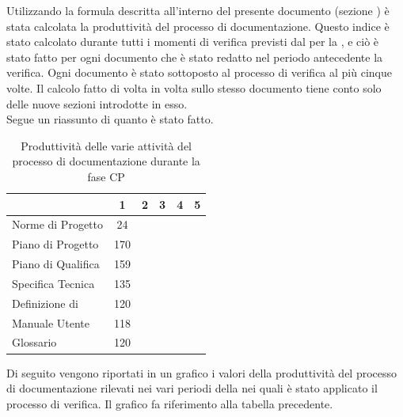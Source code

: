Utilizzando la formula descritta all'interno del presente documento (sezione ) è stata calcolata la produttività del processo di documentazione. Questo indice è stato calcolato durante tutti i momenti di verifica previsti dal  per la , e ciò è stato fatto per ogni documento che è stato redatto nel periodo antecedente la verifica. Ogni documento è stato sottoposto al processo di verifica al più cinque volte. Il calcolo fatto di volta in volta sullo stesso documento tiene conto solo delle nuove sezioni introdotte in esso.\\
Segue un riassunto di quanto è stato fatto.
\begin{table}[H]
      \centering
		\begin{tabu}{| l | c | c | c | c | c |}
		\hline
		&1	&2	&3	&4	&5	\\ \hline
		Norme di Progetto	& 24 &	&	&	& \\ \hline
		Piano di Progetto	& 170 &	&	&	& \\ \hline
		Piano di Qualifica	& 159	&	&	&	&\\ \hline
		Specifica Tecnica & 135 & & & & \\ \hline
		Definizione di  & 120 &	 	&	&  	&\\ \hline
		Manuale Utente & 118	&	&	&	& \\ \hline
		Glossario & 120 &  & & &\\ \hline
		\end{tabu}
		\caption{Produttività delle varie attività del processo di documentazione durante la fase CP}
\end{table}
Di seguito vengono riportati in un grafico i valori della produttività del processo di documentazione rilevati nei vari periodi della  nei quali è stato applicato il processo di verifica. Il grafico fa riferimento alla tabella precedente.\\

